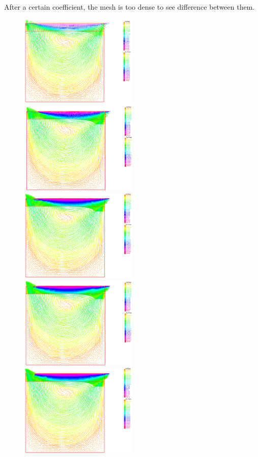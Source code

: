 \documentclass{article}
\begin{document}
After a certain coefficient, the mesh is too dense to see difference between them.

\begin{figure}[h]
	\includegraphics[width=0.5\textwidth]{imgs/solution_100_50.PNG}
	\includegraphics[width=0.5\textwidth]{imgs/solution_200_50.PNG}
	\includegraphics[width=0.5\textwidth]{imgs/solution_300_50.PNG}
	\includegraphics[width=0.5\textwidth]{imgs/solution_400_50.PNG}
	\includegraphics[width=0.5\textwidth]{imgs/solution_500_50.PNG}

\end{figure}
\end{document}
